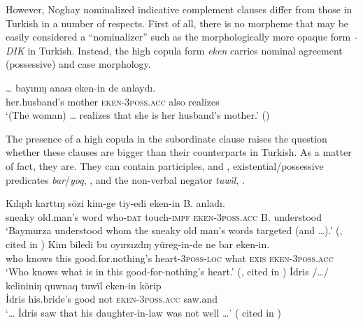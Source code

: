\documentclass[output=paper]{langsci/langscibook}
\begin{document}
\begin{sloppypar}
However, Noghay nominalized indicative complement clauses differ from those in Turkish in a number of respects. 
First of all, there is no morpheme that may be easily considered a ``nominalizer'' such as the morphologically more opaque form \textit{-DIK} in Turkish. 
Instead, the high copula form \textit{eken} carries nominal agreement (possessive) and case morphology. 
\end{sloppypar}

\ea %
    \label{kelepirex:key:17}
    \gll \ldots{} bayınıŋ anası eken-in de anlaydı. \\
    {} her.husband's mother \textsc{eken}-3\textsc{poss}.\textsc{acc} also realizes \\
    \glt `(The woman) \ldots{} realizes that she is her husband's mother.' (\citealp[343]{Karakoc2007})
\z 

The presence of a high copula in the subordinate clause raises the question whether these clauses are bigger than their counterparts in Turkish. 
As a matter of fact, they are. 
They can contain participles,  and , existential/possessive predicates \textit{bar}/\textit{yoq}, , and the non-verbal negator \textit{tuwïl}, . 

\ea %
    \label{kelepirex:key:18}
    \gll Kılıplı karttıŋ sözi kim-ge tiy-edi eken-in B. anladı. \\
    sneaky old.man's word who-\textsc{dat} touch-\textsc{impf} \textsc{eken}-\textsc{3poss.acc} B. understood \\
    \glt `Baymurza understood whom the sneaky old man's words targeted (and \ldots{}).' (\citealp[126]{DjanbidaevaOgurlieva1995}, cited in \citealp[353]{Karakoc2007})
\ex %
    \label{kelepirex:key:19}
    \gll Kim biledi bu oyırsızdıŋ yüreg-in-de ne bar eken-in.\\
    who knows this good.for.nothing's heart-\textsc{3poss}-\textsc{loc} what \textsc{exis} \textsc{eken}-\textsc{3poss}.\textsc{acc} \\
    \glt `Who knows what is in this good-for-nothing's heart.' (\citealp[55]{DjanbidaevaOgurlieva1995}, cited in \citealp[344]{Karakoc2007})
\ex %
    \label{kelepirex:key:20}
    \gll İdris /\ldots{}/ kelininiŋ  quwnaq tuwïl eken-in körip \\
    İdris     his.bride's  good      not   \textsc{eken}-\textsc{3poss}.\textsc{acc} saw.and \\
    \glt `\ldots{} İdris saw that his daughter-in-law was not well \ldots{}' (\citealp[159]{Kapaev1962} cited in \citealp[33]{Karakoc2001})
\z
\end{document}

